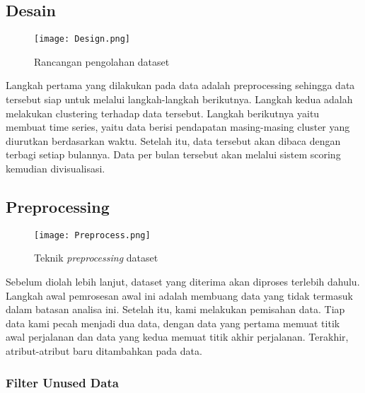 \documentclass{article}
\begin{document}
\subsection{Desain}

\begin{adjustwidth}{2em}{0pt}

\begin{figure}[H]
	\centering
	\texttt{[image: Design.png]}
	\caption{Rancangan pengolahan dataset}
\end{figure}

\hspace{\parindent}Langkah pertama yang dilakukan pada data adalah preprocessing sehingga data tersebut siap untuk melalui langkah-langkah berikutnya. Langkah kedua adalah melakukan clustering terhadap data tersebut. Langkah berikutnya yaitu membuat time series, yaitu data berisi pendapatan masing-masing cluster yang diurutkan berdasarkan waktu. Setelah itu, data tersebut akan dibaca dengan terbagi setiap bulannya. Data per bulan tersebut akan melalui sistem scoring kemudian divisualisasi.

\end{adjustwidth}

\subsection{Preprocessing}

\begin{adjustwidth}{2em}{0pt}

\begin{figure}[H]
	\centering
	\texttt{[image: Preprocess.png]}
	\caption{Teknik \textit{preprocessing} dataset}
\end{figure}

\hspace{\parindent}Sebelum diolah lebih lanjut, dataset yang diterima akan diproses terlebih dahulu. Langkah awal pemrosesan awal ini adalah membuang data yang tidak termasuk dalam batasan analisa ini. Setelah itu, kami melakukan pemisahan data. Tiap data kami pecah menjadi dua data, dengan data yang pertama memuat titik awal perjalanan dan data yang kedua memuat titik akhir perjalanan. Terakhir, atribut-atribut baru ditambahkan pada data.

\end{adjustwidth}

\subsubsection{Filter Unused Data}
\end{document}
